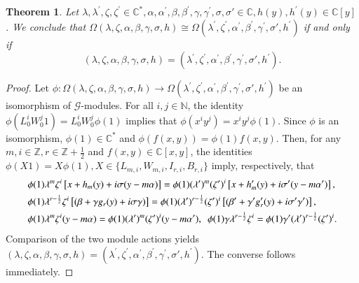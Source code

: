 \documentclass[12pt,reqno]{amsart}
\def\Z{\mathbb{Z}}
\def\N{\mathbb{N}}
\def\C{\mathbb{C}}
\numberwithin{equation}{section}
\newtheorem{theo}{Theorem}[section]
\begin{document}
\begin{theo}\label{theo3.2}
   Let $\lambda, \lambda^\prime,\zeta,\zeta^\prime\in\mathbb{C}^*, \alpha,\alpha^\prime,\beta,\beta^\prime,\gamma,\gamma^\prime,\sigma,\sigma'\in\C,h(y),h^\prime(y)\in\C[y]$. We conclude that $\Omega(\lambda, \zeta, \alpha,\beta,\gamma,\sigma,h)\cong \Omega(\lambda^\prime, \zeta^\prime,\alpha^\prime,\beta^\prime,\gamma^\prime,\sigma',h^\prime)$ if and only if 
   \[
       (\lambda, \zeta, \alpha,\beta,\gamma,\sigma,h)=(\lambda^\prime, \zeta^\prime,\alpha^\prime,\beta^\prime,\gamma^\prime,\sigma',h^\prime).
   \]
\end{theo}
\begin{proof}
    Let $\phi:\Omega(\lambda,\zeta, \alpha,\beta,\gamma,\sigma,h)\to \Omega(\lambda^\prime, \zeta^\prime,\alpha^\prime,\beta^\prime,\gamma^\prime,\sigma',h^\prime)$ be an isomorphism of ${\mathcal{G}}$-modules. For all $i,j\in\N$, the  identity $\phi(L_{0}^{i}W_{0}^j1)=L_{0}^{i}W_{0}^j\phi(1)$ implies that $\phi(x^{i}y^j)=x^{i}y^j \phi(1)$. Since $\phi$ is an isomorphism, 
    $\phi(1)\in\C^*$ 
    and $\phi(f(x,y))=\phi(1)f(x,y)$. Then, for any $m,i\in\mathbb{Z},r\in\Z+\frac{1}{2}$ and $f(x,y)\in\mathbb{C}[x,y]$, the identities 
    $\phi(X1)=X\phi(1),X\in\{L_{m,i}, W_{m,i},I_{r,i},B_{r,i} \}$ imply,
    respectively, that
\begin{equation*}
\aligned
&\phi(1)\lambda^m\zeta^i\left[x+h_{m}(y)+i\sigma(y-m\alpha)\right]=\phi(1)(\lambda^\prime)^m(\zeta^\prime)^i\left[x+h^\prime_{m}(y)+i\sigma'(y-m\alpha')\right],
\\&\phi(1)\lambda^{r-\frac{1}{2}}\zeta^i\left[(\beta+\gamma g_r(y)+i\sigma \gamma)\right] 
= \phi(1)(\lambda^\prime)^{r-\frac{1}{2}}(\zeta^\prime)^i\left[(\beta^\prime+\gamma^\prime g^\prime_r(y)+i\sigma' \gamma')\right],
\\&\phi(1)\lambda^m\zeta^i(y-m\alpha)
=\phi(1)(\lambda^\prime)^m(\zeta^\prime)^i(y-m\alpha^\prime),\ \  \phi(1)\gamma\lambda^{r-\frac{1}{2}}\zeta^i
=\phi(1)\gamma^\prime(\lambda^\prime)^{r-\frac{1}{2}}(\zeta^\prime)^i.
\endaligned
\end{equation*}
Comparison of the two module actions yields $(\lambda, \zeta, \alpha,\beta,\gamma,\sigma,h)=(\lambda^\prime, \zeta^\prime,\alpha^\prime,\beta^\prime,\gamma^\prime,\sigma',h^\prime)$. The converse follows immediately.\end{proof}
\end{document}
